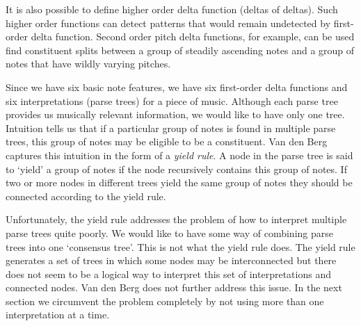 \documentclass[a4paper,10pt]{article}
\begin{document}
It is also possible to define higher order delta function (deltas of deltas). Such higher order functions can detect patterns that would remain undetected by first-order delta function. Second order pitch delta functions, for example, can be used find constituent splits between a group of steadily ascending notes and a group of notes that have wildly varying pitches. 



Since we have six basic note features, we have six first-order delta functions and six interpretations (parse trees) for a piece of music. Although each parse tree provides us musically relevant information, we would like to have only one tree. Intuition tells us that if a particular group of notes is found in multiple parse trees, this group of notes may be eligible to be a constituent. Van den Berg captures this intuition in the form of a \textit{yield rule}. A node in the parse tree is said to `yield' a group of notes if the node recursively contains this group of notes. If two or more nodes in different trees yield the same group of notes they should be connected according to the yield rule.

Unfortunately, the yield rule addresses the problem of how to interpret multiple parse trees quite poorly. We would like to have some way of combining parse trees into one `consensus tree'. This is not what the yield rule does. The yield rule generates a set of trees in which some nodes may be interconnected but there does not seem to be a logical way to interpret this set of interpretations and connected nodes. Van den Berg does not further address this issue. In the next section we circumvent the problem completely by not using more than one interpretation at a time.
\end{document}

